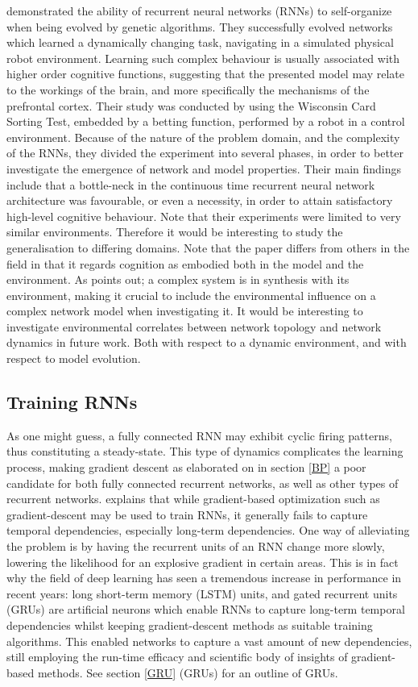 \cite{Maniadakis2012} demonstrated the ability of recurrent neural networks (RNNs) to self-organize when being evolved by genetic algorithms. They successfully evolved networks which learned a dynamically changing task, navigating in a simulated physical robot environment. Learning such complex behaviour is usually associated with higher order cognitive functions, suggesting that the presented model may relate to the workings of the brain, and more specifically the mechanisms of the prefrontal cortex.
Their study was conducted by using the Wisconsin Card Sorting Test, embedded by a betting function, performed by a robot in a control environment. Because of the nature of the problem domain, and the complexity of the RNNs, they divided the experiment into several phases, in order to better investigate the emergence of network and model properties. Their main findings include that a bottle-neck in the continuous time recurrent neural network architecture was favourable, or even a necessity, in order to attain satisfactory high-level cognitive behaviour. Note that their experiments were limited to very similar environments. Therefore it would be interesting to study the generalisation to differing domains. Note that the paper differs from others in the field in that it regards cognition as embodied both in the model and the environment. As \cite{Bar-yam1997} points out; a complex system is in synthesis with its environment, making it crucial to include the environmental influence on a complex network model when investigating it. It would be interesting to investigate environmental correlates between network topology and network dynamics in future work. Both with respect to a dynamic environment, and with respect to model evolution.

\subsection{Training RNNs}

As one might guess, a fully connected RNN may exhibit cyclic firing patterns, thus constituting a steady-state. This type of dynamics complicates the learning process, making gradient descent as elaborated on in section \ref{BP} a poor candidate for both fully connected recurrent networks, as well as other types of recurrent networks. \cite{Bengio2013b} explains that while gradient-based optimization such as gradient-descent may be used to train RNNs, it generally fails to capture temporal dependencies, especially long-term dependencies. One way of alleviating the problem is by having the recurrent units of an RNN change more slowly, lowering the likelihood for an explosive gradient in certain areas. This is in fact why the field of deep learning has seen a tremendous increase in performance in recent years: long short-term memory (LSTM) units, and gated recurrent units (GRUs) are artificial neurons which enable RNNs to capture long-term temporal dependencies whilst keeping gradient-descent methods as suitable training algorithms. This enabled networks to capture a vast amount of new dependencies, still employing the run-time efficacy and scientific body of insights of gradient-based methods. See section \ref{GRU} (GRUs) for an outline of GRUs.

